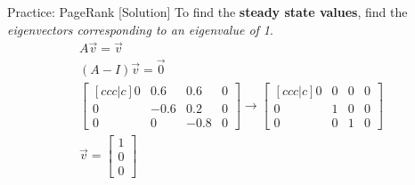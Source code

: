 \begin{frame}{Practice: PageRank [Solution]}
    To find the \textbf{steady state values}, find the \textit{eigenvectors corresponding to an eigenvalue of 1}.
    \begin{align*}
        A \vec{v} = \vec{v} \\
        (A - I) \vec{v} = \vec{0} \\[1ex]
        \begin{bmatrix}[c c c | c]
            0 & 0.6 & 0.6 & 0 \\
            0 & -0.6 & 0.2 & 0\\
            0 & 0 & -0.8 & 0
        \end{bmatrix} \longrightarrow
        \begin{bmatrix}[c c c | c]
            0 & 0 & 0 & 0 \\
            0 & 1 & 0 & 0\\
            0 & 0 & 1 & 0
        \end{bmatrix} \\[1ex]
        \vec{v} = \begin{bmatrix}
            1 \\ 0 \\ 0
        \end{bmatrix}
    \end{align*}
\end{frame}
